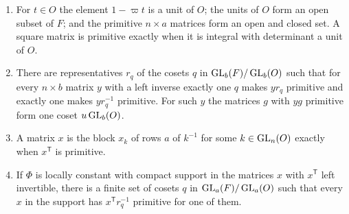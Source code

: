 \begin{lemma}\label{lem:common-cosets}
\begin{enumerate}[label=\textup{(\alph*)}]
\item For $t\in O$ the element $1-\varpi t$ is a unit of $O$; the units of $O$ form an open subset of $F$; and the primitive $n\times a$ matrices form an open and closed set. A square matrix is
primitive exactly when it is integral with determinant a unit of $O$.
\item There are representatives $r_q$ of the cosets $q$ in $\operatorname{GL}_b(F)/\operatorname{GL}_b(O)$ such that for every $n\times b$ matrix $y$ with a left inverse exactly one $q$ makes $yr_q$ primitive and exactly one makes
$yr_q^{-1}$ primitive. For such $y$ the matrices $g$ with $yg$ primitive form one coset $u\operatorname{GL}_b(O)$.
\item A matrix $x$ is the block $x_k$ of rows $a$ of $k^{-1}$ for some $k\in\operatorname{GL}_n(O)$ exactly when $x^{\mathsf T}$ is primitive.
\item If $\Phi$ is locally constant with compact support in the matrices $x$ with $x^{\mathsf T}$ left invertible, there is a finite set of cosets $q$ in $\operatorname{GL}_a(F)/\operatorname{GL}_a(O)$ such that every $x$ in the
support has $x^{\mathsf T}r_q^{-1}$ primitive for one of them.
\end{enumerate}
\end{lemma}

